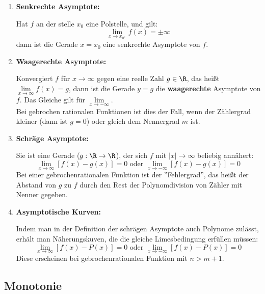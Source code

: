 \documentclass[main.tex]{subfiles}
\begin{document}
\begin{Definition}
	\begin{enumerate}
		\item \textbf{Senkrechte Asymptote:}
		
		Hat $f$ an der stelle $x_{0}$ eine Polstelle, und gilt:
			$$\lim\limits_{x \rightarrow x_{0^{\pm}}} f(x) = \pm \infty$$
		dann ist die Gerade $x=x_{0}$ eine senkrechte Asymptote von $f$.

		\item \textbf{Waagerechte Asymptote:}
		
		Konvergiert $f$ für $x\rightarrow \infty$ gegen eine reelle Zahl $g\in \R$, das heißt $\lim\limits_{x \rightarrow \infty }{f(x)}=g$, dann ist die Gerade $y=g$ die \textbf{waagerechte} Asymptote von $f$. Das Gleiche gilt für $\lim\limits_{x \rightarrow -\infty}$.\\
		Bei gebrochen rationalen Funktionen ist dies der Fall, wenn der Zählergrad kleiner (dann ist $g=0$) oder gleich dem Nennergrad $m$ ist.

		\item \textbf{Schräge Asymptote:}
		
		Sie ist eine Gerade ($g:\R \rightarrow \R$), der sich $f$ mit $|x|\rightarrow \infty$ beliebig annähert:
		$$\lim\limits_{x \rightarrow \infty}{[f(x)-g(x)]}=0 \text{ oder } \lim\limits_{x \rightarrow -\infty}{[f(x)-g(x)]}=0$$
		Bei einer gebrochenrationalen Funktion ist der ''Fehlergrad'', das heißt der Abstand von $g$ zu $f$ durch den Rest der Polynomdivision von Zähler mit Nenner gegeben.

		\item \textbf{Asymptotische Kurven:}
		
		Indem man in der Definition der schrägen Asymptote auch Polynome zulässt, erhält man Näherungskuven, die die gleiche Limesbedingung erfüllen müssen:
		$$\lim\limits_{x \rightarrow \infty}{[f(x)-P(x)]}=0 \text{ oder } \lim\limits_{x \rightarrow -\infty}{[f(x)-P(x)]}=0$$
		Diese erscheinen bei gebrochenrationalen Funktion mit $n>m+1$.
	\end{enumerate}
\end{Definition}

\subsection{Monotonie}
\end{document}
